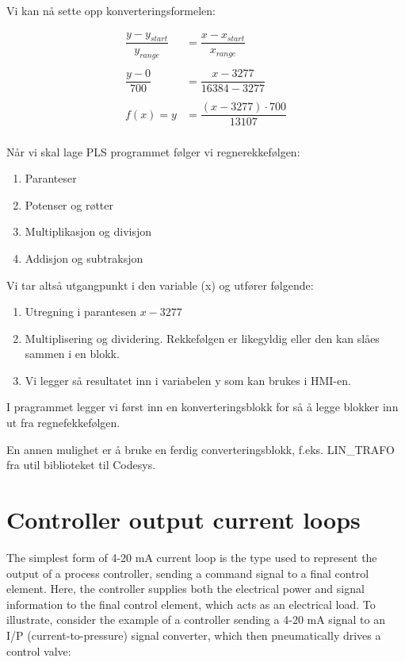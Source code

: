Vi kan nå sette opp konverteringsformelen:


	\begin{align*}
		\dfrac{y-y_{start}}{y_{range}}&=\dfrac{x-x_{start}}{x_{range}}\\
		\\
		\dfrac{y-0}{700}&=\dfrac{x-3277}{16384-3277}\\
		\\
		f(x)=y&=\dfrac{(x-3277)\cdot700}{13107}\\
	\end{align*}

Når vi skal lage PLS programmet følger vi regnerekkefølgen:

\begin{enumerate}
	\item Paranteser
	\item Potenser og røtter
	\item Multiplikasjon og divisjon
	\item Addisjon og subtraksjon

\end{enumerate}

Vi tar altså utgangpunkt  i den variable (x) og utfører følgende:

\begin{enumerate}
	\item Utregning i parantesen $x-3277$
	\item Multiplisering og dividering. Rekkefølgen er likegyldig eller den kan slåes sammen i en blokk. 
	\item Vi legger så resultatet inn i variabelen y som  kan brukes i HMI-en. 
\end{enumerate}


I pragrammet legger vi først inn en konverteringsblokk for så å legge blokker inn ut fra regnefekkefølgen.


En annen mulighet er å bruke en ferdig converteringsblokk, f.eks. LIN\_TRAFO fra util biblioteket til Codesys. 






\filbreak
\section{Controller output current loops}


The simplest form of 4-20 mA current loop is the type used to represent the output of a process controller, sending a command signal to a final control element.  Here, the controller supplies both the electrical power and signal information to the final control element, which acts as an electrical load.  To illustrate, consider the example of a controller sending a 4-20 mA signal to an I/P (current-to-pressure) signal converter, which then pneumatically drives a control valve:

